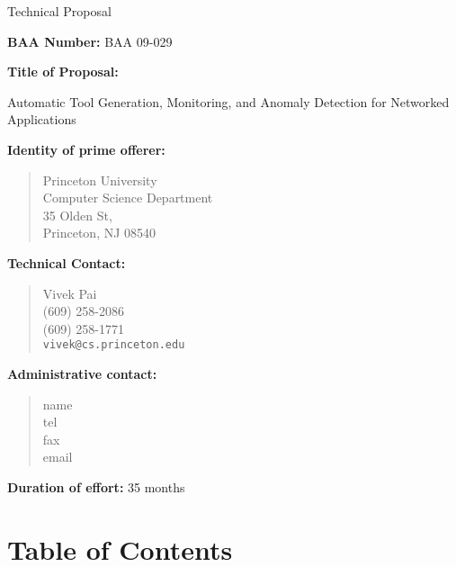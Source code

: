 \documentclass[12pt]{article}
\begin{document}
\begin{center}
{\Large Technical Proposal}
\end{center}

{\bf BAA Number:} BAA 09-029

\vspace{.5in}

{\bf Title of Proposal:}  

Automatic Tool Generation, Monitoring, and Anomaly Detection for Networked Applications

\vspace{.5in}

{\bf Identity of prime offerer:}
\begin{quote}
Princeton University \\
Computer Science Department \\
35 Olden St, \\
Princeton, NJ 08540
\end{quote}

\vspace{.5in}

{\bf Technical Contact:}  
\begin{quote}
Vivek Pai \\
(609) 258-2086 \\
(609) 258-1771 \\
{\tt vivek@cs.princeton.edu} \\
\end{quote}

\vspace{.5in}

{\bf Administrative contact:}
\begin{quote}
name \\
tel \\
fax \\
email \\
\end{quote}

\vspace{.5in}

{\bf Duration of effort:} 35 months

\newpage

\setcounter{page}{1}
\appendix

\section{Table of Contents}
\tableofcontents\
\newpage
\pagenumbering{arabic}
\setcounter{page}{1}
\end{document}
